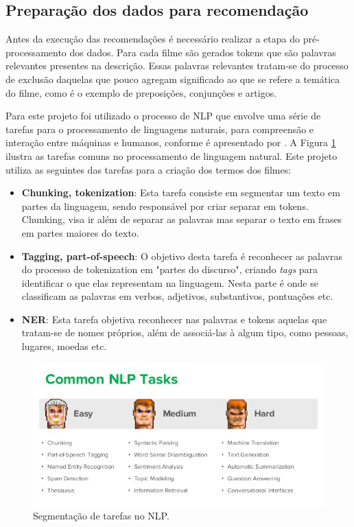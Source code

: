 \subsection{Preparação dos dados para recomendação}
\label{ssec:data_nlp}

Antes da execução das recomendações é necessário realizar a etapa do pré-processamento dos dados. Para cada filme são gerados tokens que são palavras relevantes presentes na descrição. Essas palavras relevantes tratam-se do processo de exclusão daquelas que pouco agregam significado ao que se refere a temática do filme, como é o exemplo de preposições, conjunções e artigos.

Para este projeto foi utilizado o processo de \ac{NLP} que envolve uma série de tarefas para o processamento de linguagens naturais, para compreensão e interação entre máquinas e humanos, conforme é apresentado por \cite{Collobert:2011}. A Figura \ref{fig:nlp} ilustra as tarefas comuns no processamento de linguagem natural. Este projeto utiliza as seguintes das tarefas para a criação dos termos dos filmes:

\begin{itemize}
	\item{\textbf{Chunking, tokenization}: Esta tarefa consiste em segmentar um texto em partes da linguagem, sendo responsável por criar separar em tokens. Chunking, visa ir além de separar as palavras mas separar o texto em frases em partes maiores do texto.}
	\item{\textbf{Tagging, part-of-speech}: O objetivo desta tarefa é reconhecer as palavras do processo de tokenization em "partes do discurso", criando \textit{tags} para identificar o que elas representam na linguagem. Nesta parte é onde se classificam as palavras em verbos, adjetivos, substantivos, pontuações etc.}
	\item{\textbf{\ac{NER}}: Esta tarefa objetiva reconhecer nas palavras e tokens aquelas que tratam-se de nomes próprios, além de associá-las à algum tipo, como pessoas, lugares, moedas etc.}
\end{itemize}

\begin{figure}
	\centering
	\includegraphics[scale=0.70]{imagens/nlp.jpg}
	\caption{Segmentação de tarefas no NLP. \citep{NLP2016}}
	\label{fig:nlp}
\end{figure}

